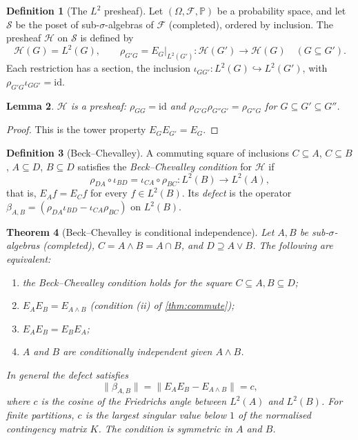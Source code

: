 \documentclass[11pt]{article}
\newtheorem{theorem}{Theorem}[section]
\newtheorem{lemma}[theorem]{Lemma}
\theoremstyle{definition}
\newtheorem{definition}[theorem]{Definition}
\newcommand{\id}{\mathrm{id}}
\newcommand{\PP}{\mathbb P}
\begin{document}
\begin{definition}[The $L^2$ presheaf]
Let $(\Omega,\mathcal F,\PP)$ be a probability space, and let $\mathcal S$ be the poset of sub-$\sigma$-algebras of $\mathcal F$
(completed), ordered by inclusion. The presheaf $\mathcal H$ on $\mathcal S$ is defined by
\[
\mathcal H(G)=L^2(G),\qquad \rho_{G'G}=E_G|_{L^2(G')}\colon\mathcal H(G')\to\mathcal H(G)\quad(G\subseteq G').
\]
Each restriction has a section, the inclusion $\iota_{GG'}\colon L^2(G)\hookrightarrow L^2(G')$, with $\rho_{G'G}\iota_{GG'}=\id$.
\end{definition}

\begin{lemma}
$\mathcal H$ is a presheaf: $\rho_{GG}=\id$ and $\rho_{G'G}\rho_{G''G'}=\rho_{G''G}$ for $G\subseteq G'\subseteq G''$.
\end{lemma}
\begin{proof}
This is the tower property $E_GE_{G'}=E_G$.
\end{proof}

\begin{definition}[Beck--Chevalley]
A commuting square of inclusions $C\subseteq A$, $C\subseteq B$, $A\subseteq D$, $B\subseteq D$ satisfies the \emph{Beck--Chevalley
condition} for $\mathcal H$ if
\[
\rho_{DA}\circ\iota_{BD}=\iota_{CA}\circ\rho_{BC}\colon L^2(B)\to L^2(A),
\]
that is, $E_Af=E_Cf$ for every $f\in L^2(B)$. Its \emph{defect} is the operator
$\beta_{A,B}=(\rho_{DA}\iota_{BD}-\iota_{CA}\rho_{BC})$ on $L^2(B)$.
\end{definition}

\begin{theorem}[Beck--Chevalley is conditional independence]\label{thm:bc}
Let $A,B$ be sub-$\sigma$-algebras (completed), $C=A\wedge B=A\cap B$, and $D\supseteq A\vee B$. The following are equivalent:
\begin{enumerate}[label=(\roman*)]
\item the Beck--Chevalley condition holds for the square $C\subseteq A,B\subseteq D$;
\item $E_AE_B=E_{A\wedge B}$ (condition (ii) of \cref{thm:commute});
\item $E_AE_B=E_BE_A$;
\item $A$ and $B$ are conditionally independent given $A\wedge B$.
\end{enumerate}
In general the defect satisfies
\[
\lVert\beta_{A,B}\rVert=\lVert E_AE_B-E_{A\wedge B}\rVert=c,
\]
where $c$ is the cosine of the Friedrichs angle between $L^2(A)$ and $L^2(B)$. For finite partitions, $c$ is the largest singular value
below $1$ of the normalised contingency matrix $K$. The condition is symmetric in $A$ and $B$.
\end{theorem}
\end{document}
